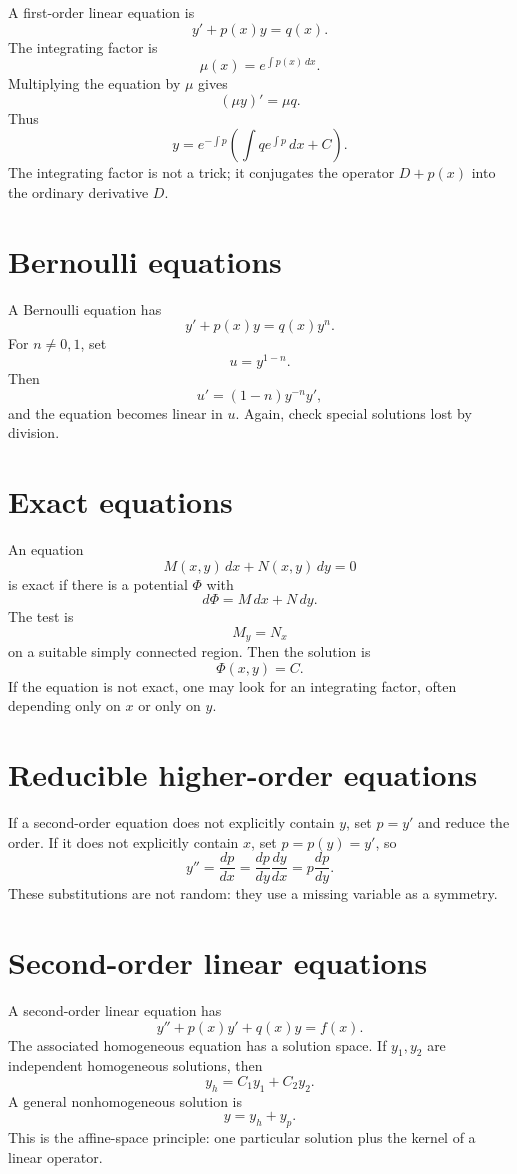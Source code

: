 A first-order linear equation is
\[
  y'+p(x)y=q(x).
\]
The integrating factor is
\[
  \mu(x)=e^{\int p(x)\,dx}.
\]
Multiplying the equation by $\mu$ gives
\[
  (\mu y)'=\mu q.
\]
Thus
\[
  y=e^{-\int p}
  \left(\int q e^{\int p}\,dx+C\right).
\]
The integrating factor is not a trick; it conjugates the operator $D+p(x)$ into the ordinary derivative $D$.

\section{Bernoulli equations}

A Bernoulli equation has
\[
  y'+p(x)y=q(x)y^n.
\]
For $n\ne0,1$, set
\[
  u=y^{1-n}.
\]
Then
\[
  u'=(1-n)y^{-n}y',
\]
and the equation becomes linear in $u$.  Again, check special solutions lost by division.

\section{Exact equations}

An equation
\[
  M(x,y)\,dx+N(x,y)\,dy=0
\]
is exact if there is a potential $\Phi$ with
\[
  d\Phi=M\,dx+N\,dy.
\]
The test is
\[
  M_y=N_x
\]
on a suitable simply connected region.  Then the solution is
\[
  \Phi(x,y)=C.
\]
If the equation is not exact, one may look for an integrating factor, often depending only on $x$ or only on $y$.

\section{Reducible higher-order equations}

If a second-order equation does not explicitly contain $y$, set $p=y'$ and reduce the order.  If it does not explicitly contain $x$, set $p=p(y)=y'$, so
\[
  y''=\frac{dp}{dx}=\frac{dp}{dy}\frac{dy}{dx}=p\frac{dp}{dy}.
\]
These substitutions are not random: they use a missing variable as a symmetry.

\section{Second-order linear equations}

A second-order linear equation has
\[
  y''+p(x)y'+q(x)y=f(x).
\]
The associated homogeneous equation has a solution space.  If $y_1,y_2$ are independent homogeneous solutions, then
\[
  y_h=C_1y_1+C_2y_2.
\]
A general nonhomogeneous solution is
\[
  y=y_h+y_p.
\]
This is the affine-space principle: one particular solution plus the kernel of a linear operator.

